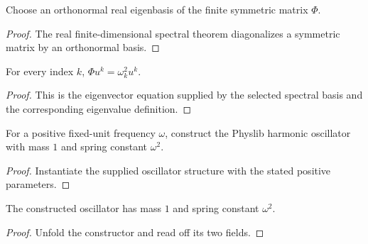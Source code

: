 \begin{definition}
\label{def:harmonic:normal-mode-basis}
Choose an orthonormal real eigenbasis of the finite symmetric matrix $\Phi$.
\end{definition}
\begin{proof}

\leanok
The real finite-dimensional spectral theorem diagonalizes a symmetric matrix
by an orthonormal basis.
\end{proof}

\begin{theorem}
\label{thm:harmonic:normal-mode-eigenvector}
For every index $k$, $\Phi u^k=\omega_k^2u^k$.
\end{theorem}
\begin{proof}

\leanok
This is the eigenvector equation supplied by the selected spectral basis and
the corresponding eigenvalue definition.
\end{proof}

\begin{definition}
\label{def:harmonic:positive-mode-oscillator}
For a positive fixed-unit frequency $\omega$, construct the Physlib harmonic
oscillator with mass $1$ and spring constant $\omega^2$.
\end{definition}
\begin{proof}

\leanok
Instantiate the supplied oscillator structure with the stated positive
parameters.
\end{proof}

\begin{theorem}
\label{thm:harmonic:positive-mode-oscillator-spec}
The constructed oscillator has mass $1$ and spring constant $\omega^2$.
\end{theorem}
\begin{proof}

\leanok
Unfold the constructor and read off its two fields.
\end{proof}

